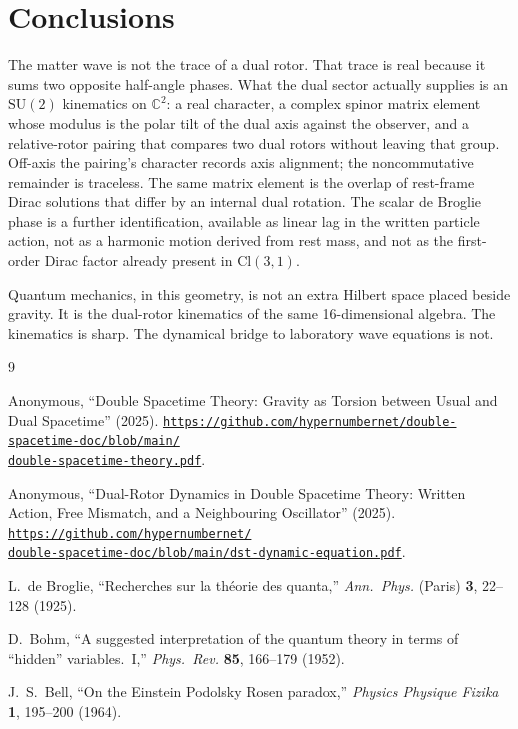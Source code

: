 \documentclass[a4paper]{article}
\begin{document}
\section{Conclusions}

The matter wave is not the trace of a dual rotor. That trace is real because it sums two opposite half-angle phases. What the dual sector actually supplies is an \(\mathrm{SU}(2)\) kinematics on \(\mathbb{C}^2\): a real character, a complex spinor matrix element whose modulus is the polar tilt of the dual axis against the observer, and a relative-rotor pairing that compares two dual rotors without leaving that group. Off-axis the pairing's character records axis alignment; the noncommutative remainder is traceless. The same matrix element is the overlap of rest-frame Dirac solutions that differ by an internal dual rotation. The scalar de Broglie phase is a further identification, available as linear lag in the written particle action, not as a harmonic motion derived from rest mass, and not as the first-order Dirac factor already present in \(\mathrm{Cl}(3,1)\).

Quantum mechanics, in this geometry, is not an extra Hilbert space placed beside gravity. It is the dual-rotor kinematics of the same 16-dimensional algebra. The kinematics is sharp. The dynamical bridge to laboratory wave equations is not.

\begin{thebibliography}{9}

Anonymous,
``Double Spacetime Theory: Gravity as Torsion between Usual and Dual Spacetime'' (2025).
\href{https://github.com/hypernumbernet/double-spacetime-doc/blob/main/double-spacetime-theory.pdf}{%
\nolinkurl{https://github.com/hypernumbernet/double-spacetime-doc/blob/main/}\\%
\nolinkurl{double-spacetime-theory.pdf}}.

Anonymous,
``Dual-Rotor Dynamics in Double Spacetime Theory: Written Action, Free Mismatch, and a Neighbouring Oscillator'' (2025).
\href{https://github.com/hypernumbernet/double-spacetime-doc/blob/main/dst-dynamic-equation.pdf}{%
\nolinkurl{https://github.com/hypernumbernet/}\\%
\nolinkurl{double-spacetime-doc/blob/main/dst-dynamic-equation.pdf}}.

L.~de Broglie,
``Recherches sur la th\'eorie des quanta,''
\textit{Ann.\ Phys.} (Paris) \textbf{3}, 22--128 (1925).

D.~Bohm,
``A suggested interpretation of the quantum theory in terms of ``hidden'' variables.\ I,''
\textit{Phys.\ Rev.} \textbf{85}, 166--179 (1952).

J.~S.~Bell,
``On the Einstein Podolsky Rosen paradox,''
\textit{Physics Physique Fizika} \textbf{1}, 195--200 (1964).

\end{thebibliography}
\end{document}
